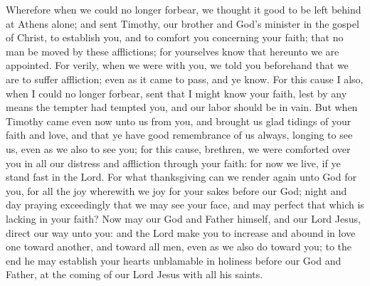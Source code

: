 Wherefore when we could no longer forbear, we thought it good to be left behind at Athens alone; and sent Timothy, our brother and God’s minister in the gospel of Christ, to establish you, and to comfort you concerning your faith; that no man be moved by these afflictions; for yourselves know that hereunto we are appointed. For verily, when we were with you, we told you beforehand that we are to suffer affliction; even as it came to pass, and ye know. For this cause I also, when I could no longer forbear, sent that I might know your faith, lest by any means the tempter had tempted you, and our labor should be in vain. But when Timothy came even now unto us from you, and brought us glad tidings of your faith and love, and that ye have good remembrance of us always, longing to see us, even as we also to see you; for this cause, brethren, we were comforted over you in all our distress and affliction through your faith: for now we live, if ye stand fast in the Lord. For what thanksgiving can we render again unto God for you, for all the joy wherewith we joy for your sakes before our God; night and day praying exceedingly that we may see your face, and may perfect that which is lacking in your faith?  Now may our God and Father himself, and our Lord Jesus, direct our way unto you: and the Lord make you to increase and abound in love one toward another, and toward all men, even as we also do toward you; to the end he may establish your hearts unblamable in holiness before our God and Father, at the coming of our Lord Jesus with all his saints. 

